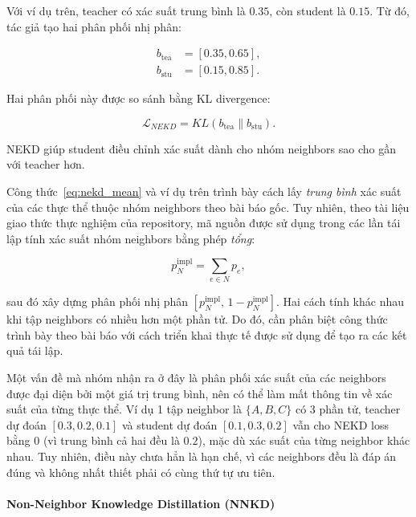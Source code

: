 Với ví dụ trên, teacher có xác suất trung bình là $0.35$, còn student là $0.15$. Từ đó, tác giả tạo hai phân phối nhị phân:

\begin{equation}
\begin{aligned}
b_{\mathrm{tea}}&=[0.35,0.65],\\
b_{\mathrm{stu}}&=[0.15,0.85].
\end{aligned}
\end{equation}

Hai phân phối này được so sánh bằng KL divergence:

\begin{equation}
\mathcal{L}_{NEKD}
=KL(b_{\mathrm{tea}}\|b_{\mathrm{stu}}).
\end{equation}

NEKD giúp student điều chỉnh xác suất dành cho nhóm neighbors sao cho gần với teacher hơn.

Công thức~\eqref{eq:nekd_mean} và ví dụ trên trình bày
cách lấy \textit{trung bình} xác suất của các thực thể thuộc nhóm
neighbors theo bài báo gốc. Tuy nhiên, theo tài liệu giao thức
thực nghiệm của repository, mã nguồn được sử dụng trong
các lần tái lập tính xác suất nhóm neighbors bằng phép \textit{tổng}:

\begin{equation}
    p_N^{\mathrm{impl}} = \sum_{e \in N} p_e,
    \label{eq:nekd_sum}
\end{equation}

\noindent
sau đó xây dựng phân phối nhị phân
$\left[p_N^{\mathrm{impl}},\,1-p_N^{\mathrm{impl}}\right]$.
Hai cách tính khác nhau khi tập neighbors có nhiều hơn
một phần tử. Do đó, cần phân biệt công thức trình bày
theo bài báo với cách triển khai thực tế được sử dụng
để tạo ra các kết quả tái lập.

Một vấn đề mà nhóm nhận ra ở đây là phân phối xác suất của các neighbors được đại diện bởi một giá trị trung bình, nên có thể làm mất thông tin về xác suất của từng thực thể. Ví dụ 1 tập neighbor là $\{A,B,C\}$ có 3 phần tử, teacher dự đoán $[0.3,0.2,0.1]$ và student dự đoán $[0.1,0.3,0.2]$ vẫn cho NEKD loss bằng $0$ (vì trung bình cả hai đều là $0.2$), mặc dù xác suất của từng neighbor khác nhau. Tuy nhiên, điều này chưa hẳn là hạn chế, vì các neighbors đều là đáp án đúng và không nhất thiết phải có cùng thứ tự ưu tiên.

\paragraph{Non-Neighbor Knowledge Distillation (NNKD)}

